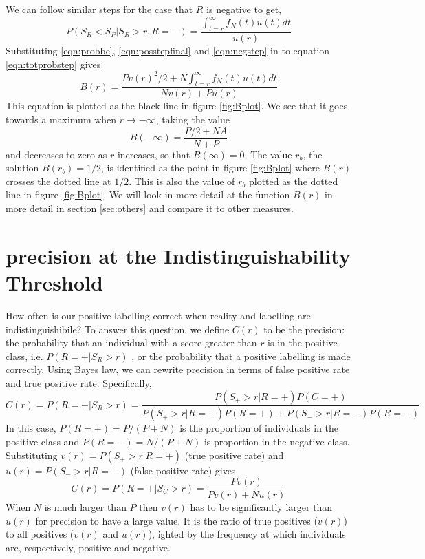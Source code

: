\documentclass{article}
\begin{document}
We can follow similar steps for the case that $R$ is negative to get,
\begin{equation}
P(S_R < S_P | S_{R} > r ,  R = -   ) = \frac{\int_{t=r}^\infty f_N(t) u(t) dt}{u(r)}  \label{eqn:negstep}
\end{equation}
Substituting \ref{eqn:probbe}, \ref{eqn:posstepfinal} and \ref{eqn:negstep} in to equation \ref{eqn:totprobstep} gives
\begin{equation}
B(r) = \frac{P v(r)^2/2 + N \int_{t=r}^\infty f_N(t) u(t) dt }{N v(r) + P u(r)} 
 \label{eqn:Bdef} 
\end{equation}
This equation is plotted as the black line in figure \ref{fig:Bplot}. We see that it goes towards a maximum when $r \rightarrow -\infty$, taking the value
\[
B(-\infty) = \frac{P/2 + N A}{N + P} 
\]
and decreases to zero as $r$ increases, so that $B(\infty) = 0$. The value $r_b$, the solution $B(r_b)=1/2$, is identified as the point in figure \ref{fig:Bplot} where $B(r)$ crosses the dotted line at $1/2$. This is also the value of $r_b$ plotted as the dotted line in figure \ref{fig:Bplot}. We will look in more detail at the function $B(r)$ in more detail in section \ref{sec:others} and compare it to other measures. 

\section{precision at the Indistinguishability Threshold}

How often is our positive labelling correct when reality and labelling are indistinguishibile? To answer this question, we define $C(r)$ to be the precision: the probability that an individual with a score greater than $r$ is in the positive class, i.e. $P(R = + | S_R > r)$ , or the probability that a positive labelling is made correctly.  Using Bayes law, we can rewrite precision in terms of false positive rate and true positive rate. Specifically,
\[
C(r) = P(R = + | S_R > r) = \frac{P(S_+ > r | R = + ) P(C = + )}{P(S_+ > r | R = + ) P(R = + ) + P(S_- > r | R = - ) P(R = - )}
\]
In this case, $P(R = + ) = P/(P+N)$ is the proportion of individuals in the positive class and $P(R = - ) = N/(P+N)$ is proportion in the negative class. Substituting $v(r)=P(S_+ > r | R = + )$ (true positive rate) and $u(r) = P(S_- > r | R = - )$  (false positive rate) gives
\begin{equation}
C(r) = P(R = + | S_C > r) = \frac{P v(r)}{P v(r) + N u(r)} \label{precisionP}
\end{equation}
When $N$ is much larger than $P$ then $v(r)$ has to be significantly larger than $u(r)$ for precision to have a large value. It is the ratio of true positives ($v(r)$) to all positives ($v(r)$ and $u(r)$), ighted by the frequency at which individuals are, respectively, positive and negative. 
\end{document}
